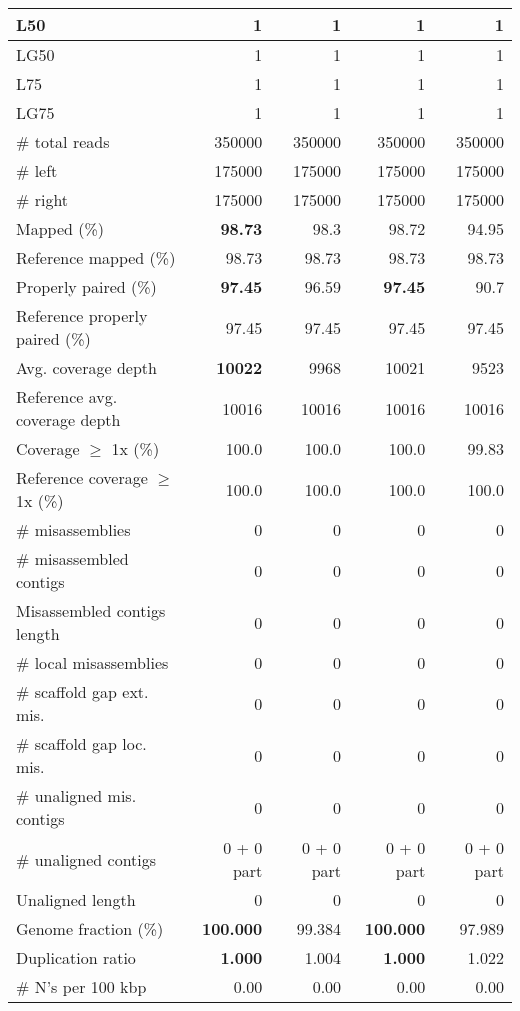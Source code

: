 \documentclass[12pt,a4paper]{article}
\begin{document}
\begin{table}[ht]
\begin{center}
\begin{tabular}{|l*{4}{|r}|}
L50 & 1 & 1 & 1 & 1 \\ \hline
LG50 & 1 & 1 & 1 & 1 \\ \hline
L75 & 1 & 1 & 1 & 1 \\ \hline
LG75 & 1 & 1 & 1 & 1 \\ \hline
\# total reads & 350000 & 350000 & 350000 & 350000 \\ \hline
\# left & 175000 & 175000 & 175000 & 175000 \\ \hline
\# right & 175000 & 175000 & 175000 & 175000 \\ \hline
Mapped (\%) & {\bf 98.73} & 98.3 & 98.72 & 94.95 \\ \hline
Reference mapped (\%) & 98.73 & 98.73 & 98.73 & 98.73 \\ \hline
Properly paired (\%) & {\bf 97.45} & 96.59 & {\bf 97.45} & 90.7 \\ \hline
Reference properly paired (\%) & 97.45 & 97.45 & 97.45 & 97.45 \\ \hline
Avg. coverage depth & {\bf 10022} & 9968 & 10021 & 9523 \\ \hline
Reference avg. coverage depth & 10016 & 10016 & 10016 & 10016 \\ \hline
Coverage $\geq$ 1x (\%) & 100.0 & 100.0 & 100.0 & 99.83 \\ \hline
Reference coverage $\geq$ 1x (\%) & 100.0 & 100.0 & 100.0 & 100.0 \\ \hline
\# misassemblies & 0 & 0 & 0 & 0 \\ \hline
\# misassembled contigs & 0 & 0 & 0 & 0 \\ \hline
Misassembled contigs length & 0 & 0 & 0 & 0 \\ \hline
\# local misassemblies & 0 & 0 & 0 & 0 \\ \hline
\# scaffold gap ext. mis. & 0 & 0 & 0 & 0 \\ \hline
\# scaffold gap loc. mis. & 0 & 0 & 0 & 0 \\ \hline
\# unaligned mis. contigs & 0 & 0 & 0 & 0 \\ \hline
\# unaligned contigs & 0 + 0 part & 0 + 0 part & 0 + 0 part & 0 + 0 part \\ \hline
Unaligned length & 0 & 0 & 0 & 0 \\ \hline
Genome fraction (\%) & {\bf 100.000} & 99.384 & {\bf 100.000} & 97.989 \\ \hline
Duplication ratio & {\bf 1.000} & 1.004 & {\bf 1.000} & 1.022 \\ \hline
\# N's per 100 kbp & 0.00 & 0.00 & 0.00 & 0.00 \\ \hline

\end{tabular}
\end{center}
\end{table}
\end{document}
